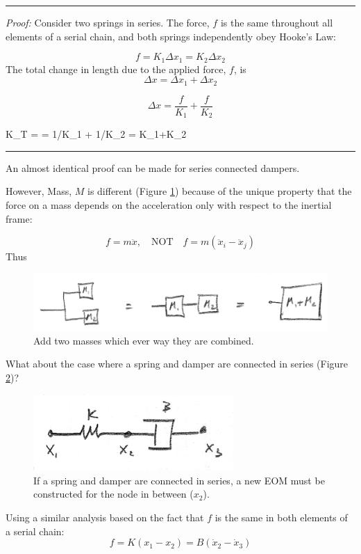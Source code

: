 \hrule
{\it Proof:}
Consider two springs in series.
The force, $f$ is the same throughout all elements of a serial chain, and both springs independently obey Hooke's Law:

\[
f = K_1\Delta x_1 = K_2\Delta x_2
\]
The total change in length due to the applied force, $f$, is
\[
\Delta x = \Delta x_1 + \Delta x_2
\]

\[
\Delta x = \frac{f}{K_1} + \frac{f}{K_2}
\]

\bq
K_T =  =   {1/K_1 + 1/K_2} =  {K_1+K_2}
\eq
\hrule

An almost identical proof can be made for series connected dampers.

However, Mass, $M$ is different (Figure \ref{addtwomasses}) because of the unique property that the force on a mass depends on the acceleration only with respect to the inertial frame:

\[
f = m\ddot{x}, \quad \mathrm{NOT} \quad f = m(\ddot{x}_i - \ddot{x}_j)
\]
Thus


\begin{figure}[h]\centering
\includegraphics[width=4.5in]{figs02/00724a.png}
\caption{Add two masses which ever way they are combined.}\label{addtwomasses}
\end{figure}

What about the case where a spring and damper are connected in series (Figure \ref{springseriesdamper})?


\begin{figure}\centering
\includegraphics[width=3.0in]{figs02/00725a.png}
\caption{If a spring and damper are connected in series, a new EOM must be constructed for the node in between ($x_2$).}\label{springseriesdamper}
\end{figure}

Using a similar analysis based on the fact that $f$ is the same in both elements of a serial chain:
\[
f = K(x_1-x_2) = B(\dot{x}_2-\dot{x}_3)
\]

